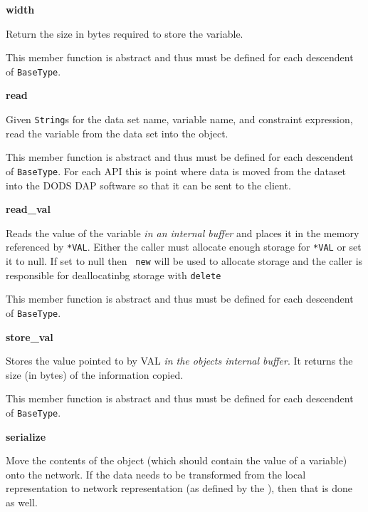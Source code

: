\begin{description}
\item {\bf width}


Return the size in bytes required to store the variable.

This member function is abstract and thus must be defined for
each descendent of {\tt BaseType}.

\item {\bf read}


Given {\tt String}s for the data set name, variable name, and constraint
expression, read the variable from the data set into the object.

This member function is abstract and thus must be defined for each descendent
of {\tt BaseType}. For each API this is point where data is moved from the
dataset into the DODS DAP software so that it can be sent to the client.

\item {\bf read\_val}


Reads the value of the variable {\em in an internal buffer\/} and places it
in the memory referenced by {\tt **VAL}.  Either the caller must allocate
enough storage for {\tt **VAL} or set it to null.  If set to null then {\tt
new} will be used to allocate storage and the caller is responsible for
deallocatinbg storage with {\tt delete}

This member function is abstract and thus must be defined for each descendent
of {\tt BaseType}.

\item {\bf store\_val}


Stores the value pointed to by VAL {\em in the objects internal buffer\/}.
It returns the size (in bytes) of the information copied.

This member function is abstract and thus must be defined for each descendent
of {\tt BaseType}.

\item {\bf serialize}


Move the contents of the object (which should contain the value of a
variable) onto the network. If the data needs to be transformed from the
local representation to network representation (as defined by the \Dap), then
that is done as well.


\end{description}
